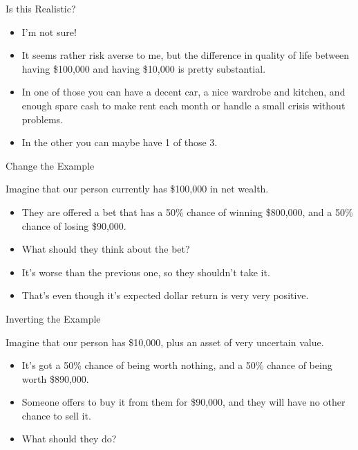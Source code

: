 \documentclass[
  ignorenonframetext,
]{beamer}
\providecommand{\tightlist}{%
  \setlength{\itemsep}{0pt}\setlength{\parskip}{0pt}}
\renewcommand{\,}{\text{, }}
\begin{document}
\begin{frame}{Is this Realistic?}
\protect\hypertarget{is-this-realistic}{}

\begin{itemize}
\tightlist
\item
  I'm not sure!
\item
  It seems rather risk averse to me, but the difference in quality of
  life between having \$100,000 and having \$10,000 is pretty
  substantial.
\item
  In one of those you can have a decent car, a nice wardrobe and
  kitchen, and enough spare cash to make rent each month or handle a
  small crisis without problems.
\item
  In the other you can maybe have 1 of those 3.
\end{itemize}

\end{frame}

\begin{frame}{Change the Example}
\protect\hypertarget{change-the-example}{}

Imagine that our person currently has \$100,000 in net wealth.

\begin{itemize}
\tightlist
\item
  They are offered a bet that has a 50\% chance of winning \$800,000,
  and a 50\% chance of losing \$90,000.
\item
  What should they think about the bet? \pause
\item
  It's worse than the previous one, so they shouldn't take it.
\item
  That's even though it's expected dollar return is very very positive.
\end{itemize}

\end{frame}

\begin{frame}{Inverting the Example}
\protect\hypertarget{inverting-the-example}{}

Imagine that our person has \$10,000, plus an asset of very uncertain
value.

\begin{itemize}
\tightlist
\item
  It's got a 50\% chance of being worth nothing, and a 50\% chance of
  being worth \$890,000.
\item
  Someone offers to buy it from them for \$90,000, and they will have no
  other chance to sell it.
\item
  What should they do?
\end{itemize}

\end{frame}
\end{document}
